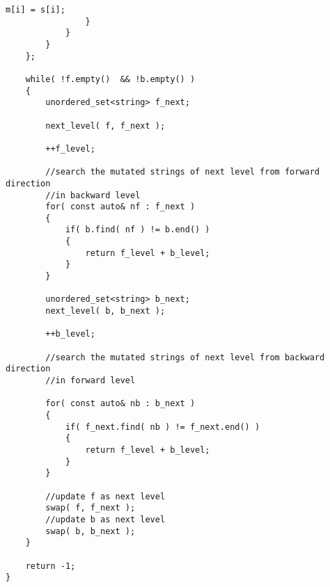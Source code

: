 \begin{lstlisting}[style=customc, caption={Two-way Breadth First Search}]
                    m[i] = s[i];
                }
            }
        }
    };

    while( !f.empty()  && !b.empty() )
    {
        unordered_set<string> f_next;

        next_level( f, f_next );

        ++f_level;

        //search the mutated strings of next level from forward direction
        //in backward level
        for( const auto& nf : f_next )
        {
            if( b.find( nf ) != b.end() )
            {
                return f_level + b_level;
            }
        }

        unordered_set<string> b_next;
        next_level( b, b_next );

        ++b_level;

        //search the mutated strings of next level from backward direction
        //in forward level

        for( const auto& nb : b_next )
        {
            if( f_next.find( nb ) != f_next.end() )
            {
                return f_level + b_level;
            }
        }

        //update f as next level
        swap( f, f_next );
        //update b as next level
        swap( b, b_next );
    }

    return -1;
}
\end{lstlisting}